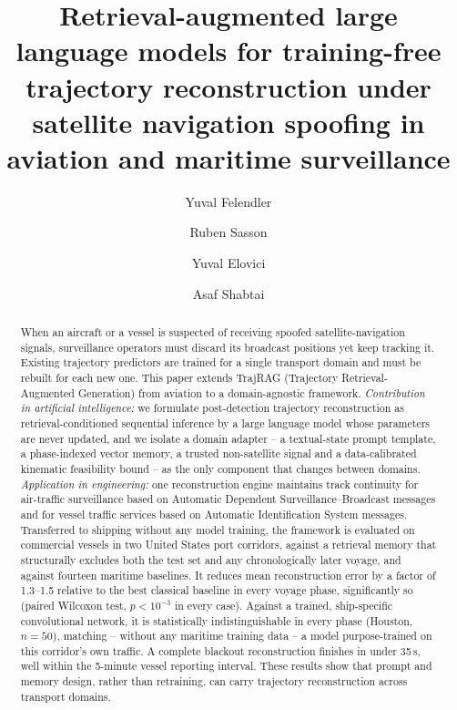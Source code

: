 \documentclass[preprint,12pt,authoryear]{elsarticle}
\begin{document}
\begin{frontmatter}

\title{Retrieval-augmented large language models for training-free trajectory reconstruction under satellite navigation spoofing in aviation and maritime surveillance}

\author[bgu]{Yuval Felendler}
\author[bgu]{Ruben Sasson}
\author[bgu]{Yuval Elovici}
\author[bgu]{Asaf Shabtai}

\address[bgu]{Faculty of Computer and Information Science, Ben-Gurion University of the Negev, Beer-Sheva, Israel}

\begin{abstract}
When an aircraft or a vessel is suspected of receiving spoofed satellite-navigation
signals, surveillance operators must discard its broadcast positions yet keep
tracking it. Existing trajectory predictors are trained for a single transport
domain and must be rebuilt for each new one. This paper extends TrajRAG
(Trajectory Retrieval-Augmented Generation) from aviation to a domain-agnostic
framework. \emph{Contribution in artificial intelligence:} we formulate
post-detection trajectory reconstruction as retrieval-conditioned sequential
inference by a large language model whose parameters are never updated, and we
isolate a domain adapter -- a textual-state prompt template, a phase-indexed
vector memory, a trusted non-satellite signal and a data-calibrated kinematic
feasibility bound -- as the only component that changes between domains.
\emph{Application in engineering:} one reconstruction engine maintains track
continuity for air-traffic surveillance based on Automatic Dependent
Surveillance--Broadcast messages and for vessel traffic services based on
Automatic Identification System messages. Transferred to shipping without any
model training, the framework is evaluated on commercial vessels in two
United States port corridors, against a retrieval memory that structurally
excludes both the test set and any chronologically later voyage, and against
fourteen maritime baselines. It reduces mean reconstruction error by a factor
of 1.3--1.5 relative to the best classical baseline in every voyage phase,
significantly so (paired Wilcoxon test, $p<10^{-3}$ in every case). Against a
trained, ship-specific convolutional network, it is statistically
indistinguishable in every phase (Houston, $n=50$), matching -- without any
maritime training data -- a model purpose-trained on this corridor's own
traffic. A complete blackout reconstruction finishes in under 35\,s, well
within the 5-minute vessel reporting interval. These results show that prompt
and memory design, rather than retraining, can carry trajectory reconstruction
across transport domains.
\end{abstract}


\end{frontmatter}
\end{document}
